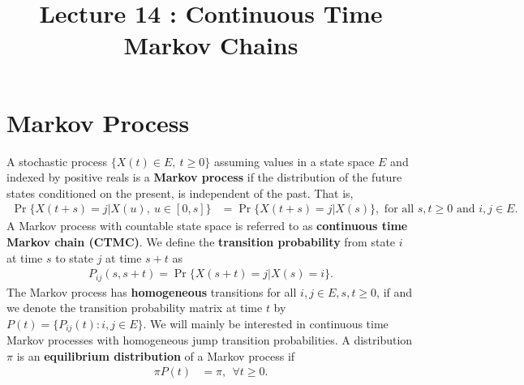\documentclass[a4paper,10pt,english]{article}
\title{Lecture 14 : Continuous Time Markov Chains}
\author{}
\begin{document}
\maketitle

\section{Markov Process}
A stochastic process $\{X(t) \in E, ~ t \geqslant 0\}$ assuming values in a state space $E$ and 
indexed by positive reals is a \textbf{Markov process} if 
the distribution of the future states conditioned on the present, is independent of the past. 
That is,
\begin{align*}
\Pr\{X(t+s) = j |X(u),~ u \in [0,s]\} &= \Pr\{X(t+s) = j |X(s)\}, \text{ for all } s, t \geqslant 0 \text{ and } i, j \in E.
\end{align*} 
A Markov process with countable state space is referred to as \textbf{continuous time Markov chain (CTMC)}. 
We define the \textbf{transition probability} from state $i$ at time $s$ to state $j$ at time $s+t$ as 
\begin{align*}
P_{ij}(s, s+t) = \Pr\{X(s+t) = j | X(s) = i\}.
\end{align*}
The Markov process has \textbf{homogeneous} transitions for all $i,j \in E, s,t \geqslant 0$, if
and we denote the transition probability matrix at time $t$ by $P(t) = \{P_{ij}(t): i, j \in E\}$. 
We will mainly be interested in continuous time Markov processes with homogeneous jump transition probabilities. 
A distribution $\pi$ is an \textbf{equilibrium distribution} of a Markov process if
\begin{align*}
\pi P(t) &= \pi,~~ \forall t \geqslant 0. 
\end{align*}
\end{document}
